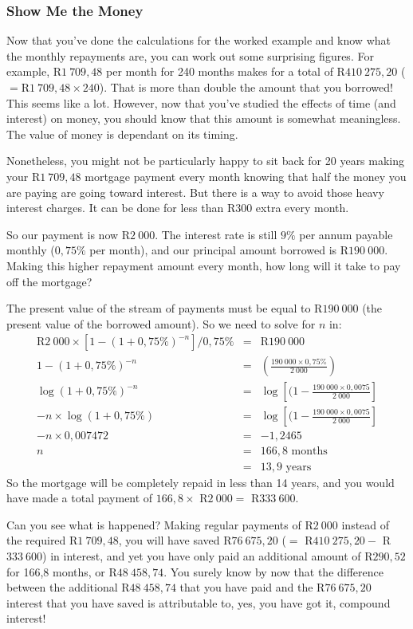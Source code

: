 \subsubsection{Show Me the Money}
Now that you've done the calculations for the worked example and know what the monthly repayments are, you can work out some surprising figures. For example, R$1~709,48$ per month for 240 months makes for a total of R$410~275,20$ ($=$R$1~709,48 \times 240$). That is more than double the amount that you borrowed! This seems like a lot. However, now that you've studied the effects of time (and interest) on money, you should know that this amount is somewhat meaningless. The value of money is dependant on its timing.

Nonetheless, you might not be particularly happy to sit back for 20 years making your R$1~709,48$ mortgage payment every month knowing that half the money you are paying are going toward interest. But there is a way to avoid those heavy interest charges. It can be done for less than R$300$ extra every month.

So our payment is now R$2~000$. The interest rate is still $9\%$ per annum payable monthly ($0,75\%$ per month), and our principal amount borrowed is R$190~000$. Making this higher repayment amount every month, how long will it take to pay off the mortgage?

The present value of the stream of payments must be equal to R$190~000$ (the present value of the borrowed amount). So we need to solve for $n$ in:
\begin{eqnarray*}
\mbox{R}2~000 \times [1 - (1 + 0,75\%)^{-n}]/0,75\% &=& \mbox{R}190~000\\
1 - (1 + 0,75\%)^{-n} &=& (\frac{190~000\times 0,75\%}{2~000})\\
\log(1+0,75\%)^{-n} &=& \log[(1 - \frac{190~000\times 0,0075}{2~000}]\\
-n\times \log(1+0,75\%) &=& \log[(1 - \frac{190~000\times 0,0075}{2~000}]\\
-n \times 0,007472 &=& -1,2465\\
n &=& 166,8 \mbox{ months}\\
& =& 13,9 \mbox{ years}
\end{eqnarray*}
So the mortgage will be completely repaid in less than 14 years, and you would have made a total payment of $166,8\times$ R$2~000 =$ R$333~600$.

Can you see what is happened? Making regular payments of R$2~000$ instead of the required R$1~709,48$, you will have saved R$76~675,20$ ($=$ R$410~275,20 -$ R$333~600$) in interest, and yet you have only paid an additional amount of R$290,52$ for 166,8 months, or R$48~458,74$. You surely know by now that the difference between the additional R$48~458,74$ that you have paid and the R$76~675,20$ interest that you have saved is attributable to, yes, you have got it, compound interest!

